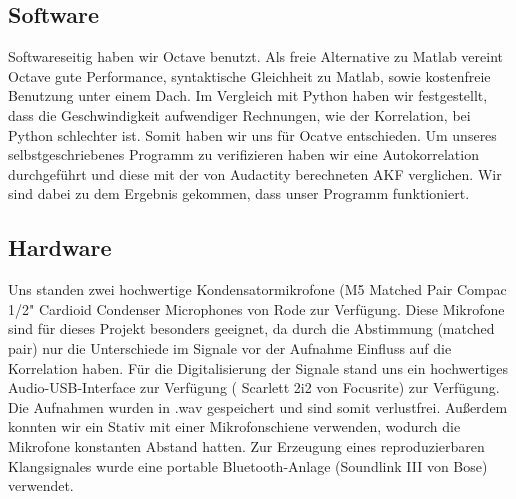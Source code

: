 \subsection{Software}
Softwareseitig haben wir Octave benutzt. Als freie Alternative zu Matlab vereint Octave gute Performance, syntaktische Gleichheit zu Matlab, sowie kostenfreie Benutzung unter einem Dach. Im Vergleich mit Python haben wir festgestellt, dass die Geschwindigkeit aufwendiger Rechnungen, wie der Korrelation, bei Python schlechter ist. Somit haben wir uns für Ocatve entschieden. Um unseres selbstgeschriebenes Programm zu verifizieren haben wir eine Autokorrelation durchgeführt und diese mit der von Audactity berechneten AKF verglichen. Wir sind dabei zu dem Ergebnis gekommen, dass unser Programm funktioniert.
\subsection{Hardware}
Uns standen zwei hochwertige Kondensatormikrofone (M5 Matched Pair Compac 1/2" Cardioid Condenser Microphones von Rode zur Verfügung. Diese Mikrofone sind für dieses Projekt besonders geeignet, da durch die Abstimmung (matched pair) nur die Unterschiede im Signale vor der Aufnahme Einfluss auf die Korrelation haben. Für die Digitalisierung der Signale stand uns ein hochwertiges Audio-USB-Interface zur Verfügung ( Scarlett 2i2 von Focusrite) zur Verfügung. Die Aufnahmen wurden in .wav gespeichert und sind somit verlustfrei. Außerdem konnten wir ein Stativ mit einer Mikrofonschiene verwenden, wodurch die Mikrofone konstanten Abstand hatten. Zur Erzeugung eines reproduzierbaren Klangsignales wurde eine portable Bluetooth-Anlage (Soundlink III von Bose) verwendet.
